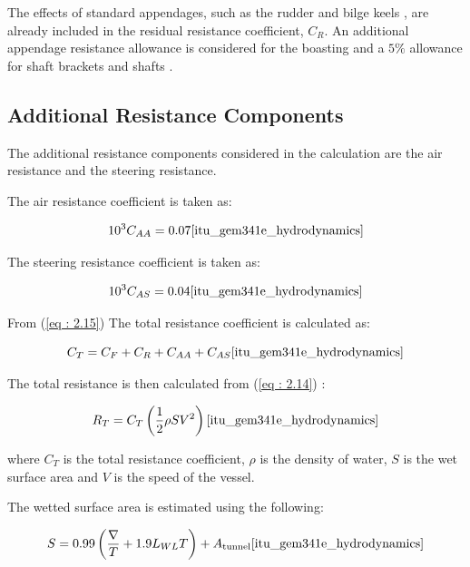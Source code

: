 \documentclass[12pt,a4paper,twoside]{report}
\begin{document}
The effects of standard appendages, such as the rudder and bilge keels
, are already included in the residual resistance coefficient, $C_R$.
An additional appendage resistance allowance is considered for the
boasting and a $5\%$ allowance for shaft brackets and shafts
\cite{itu_gem341e_hydrodynamics}.

\subsection{Additional Resistance Components}

The additional resistance components considered in the calculation
are the air resistance and the steering resistance.

\vspace{\baselineskip} \par \noindent The air resistance coefficient is taken as:

\[
10^3 C_{AA}=0.07
\cite{itu_gem341e_hydrodynamics}
\]

\vspace{\baselineskip} \par \noindent The steering resistance coefficient is taken as:

\[
10^3 C_{AS}=0.04 \cite{itu_gem341e_hydrodynamics}
\]

\vspace{\baselineskip} \par \noindent From (\ref{eq : 2.15}) The total resistance coefficient is calculated as:

\[
C_T=C_F+C_R+C_{AA}+C_{AS}
\cite{itu_gem341e_hydrodynamics}
\]

\vspace{\baselineskip} \par \noindent The total resistance is then calculated from (\ref{eq : 2.14}) :

\[
R_T=C_T\left(\frac{1}{2}\rho S V^2\right)
\cite{itu_gem341e_hydrodynamics}
\]

\vspace{\baselineskip} \par \noindent where $C_T$ is the total resistance coefficient, $\rho$ is the
density of water, $S$ is the wet surface area and $V$ is the
 speed of the vessel.

\vspace{\baselineskip} \par \noindent The wetted surface area is estimated using the following:

\begin{equation}
S=0.99\left(\frac{\nabla}{T}+1.9L_{WL}T\right)
+A_{\mathrm{tunnel}}
\cite{itu_gem341e_hydrodynamics}
\end{equation}
\end{document}
